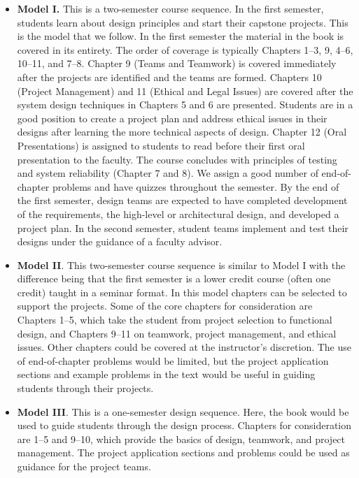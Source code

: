 \begin{itemize}
\item
  \textbf{Model I.} This is a two-semester course sequence. In the first
  semester, students learn about design principles and start their
  capstone projects. This is the model that we follow. In the first
  semester the material in the book is covered in its entirety. The
  order of coverage is typically Chapters 1--3, 9, 4--6, 10--11, and
  7--8. Chapter 9 (Teams and Teamwork) is covered immediately after the
  projects are identified and the teams are formed. Chapters 10 (Project
  Management) and 11 (Ethical and Legal Issues) are covered after the
  system design techniques in Chapters 5 and 6 are presented. Students
  are in a good position to create a project plan and address ethical
  issues in their designs after learning the more technical aspects of
  design. Chapter 12 (Oral Presentations) is assigned to students to
  read before their first oral presentation to the faculty. The course
  concludes with principles of testing and system reliability (Chapter 7
  and 8). We assign a good number of end-of-chapter problems and have
  quizzes throughout the semester. By the end of the first semester,
  design teams are expected to have completed development of the
  requirements, the high-level or architectural design, and developed a
  project plan. In the second semester, student teams implement and test
  their designs under the guidance of a faculty advisor.
\item
  \textbf{Model II}. This two-semester course sequence is similar to
  Model I with the difference being that the first semester is a lower
  credit course (often one credit) taught in a seminar format. In this
  model chapters can be selected to support the projects. Some of the
  core chapters for consideration are Chapters 1--5, which take the
  student from project selection to functional design, and Chapters
  9--11 on teamwork, project management, and ethical issues. Other
  chapters could be covered at the instructor's discretion. The use of
  end-of-chapter problems would be limited, but the project application
  sections and example problems in the text would be useful in guiding
  students through their projects.
\item
  \textbf{Model III}. This is a one-semester design sequence. Here, the
  book would be used to guide students through the design process.
  Chapters for consideration are 1--5 and 9--10, which provide the
  basics of design, teamwork, and project management. The project
  application sections and problems could be used as guidance for the
  project teams.
\end{itemize}


